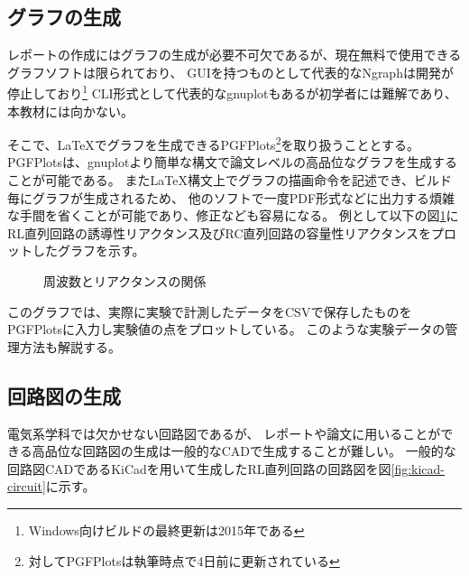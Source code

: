 \documentclass[uplatex]{jsarticle}
\begin{document}
	\subsection{グラフの生成}
		レポートの作成にはグラフの生成が必要不可欠であるが、現在無料で使用できるグラフソフトは限られており、
		GUIを持つものとして代表的なNgraphは開発が停止しており\footnote{Windows向けビルドの最終更新は2015年である}
		CLI形式として代表的なgnuplotもあるが初学者には難解であり、本教材には向かない。

		そこで、\LaTeX でグラフを生成できるPGFPlots\footnote{対してPGFPlotsは執筆時点で4日前に更新されている}を取り扱うこととする。
		PGFPlotsは、gnuplotより簡単な構文で論文レベルの高品位なグラフを生成することが可能である。
		また\LaTeX 構文上でグラフの描画命令を記述でき、ビルド毎にグラフが生成されるため、
		他のソフトで一度PDF形式などに出力する煩雑な手間を省くことが可能であり、修正なども容易になる。
		例として以下の図\ref{fig:XLXC}に
		RL直列回路の誘導性リアクタンス及びRC直列回路の容量性リアクタンスをプロットしたグラフを示す。

		\begin{figure}[H]
			\centering
			\caption{周波数とリアクタンスの関係}
			\label{fig:XLXC}
		\end{figure}

		このグラフでは、実際に実験で計測したデータをCSVで保存したものをPGFPlotsに入力し実験値の点をプロットしている。
		このような実験データの管理方法も解説する。

	\subsection{回路図の生成}
		電気系学科では欠かせない回路図であるが、
		レポートや論文に用いることができる高品位な回路図の生成は一般的なCADで生成することが難しい。
		一般的な回路図CADであるKiCadを用いて生成したRL直列回路の回路図を図\ref{fig:kicad-circuit}に示す。
\end{document}
